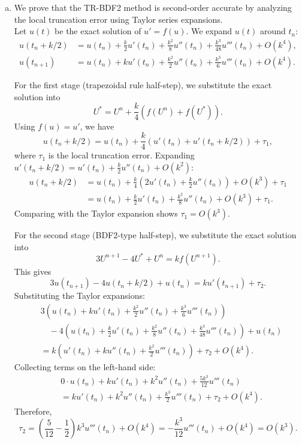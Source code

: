 \documentclass{article}
\begin{document}
\begin{enumerate}[(a)]
  \item We prove that the TR-BDF2 method is second-order accurate by analyzing the local truncation error using Taylor series expansions. \\
    
    Let $u(t)$ be the exact solution of $u' = f(u)$. We expand $u(t)$ around $t_n$:
    \begin{align*}
    u(t_n + k/2) &= u(t_n) + \frac{k}{2}u'(t_n) + \frac{k^2}{8}u''(t_n) + \frac{k^3}{48}u'''(t_n) + O(k^4), \\
    u(t_{n+1}) &= u(t_n) + ku'(t_n) + \frac{k^2}{2}u''(t_n) + \frac{k^3}{6}u'''(t_n) + O(k^4).
    \end{align*}
    
    For the first stage (trapezoidal rule half-step), we substitute the exact solution into
    \begin{equation}
      U^{*} = U^n + \frac{k}{4}(f(U^n) + f(U^{*})). \label{eq:Q2Step1}
    \end{equation}
    Using $f(u) = u'$, we have
    \[
    u(t_n + k/2) = u(t_n) + \frac{k}{4}(u'(t_n) + u'(t_n + k/2)) + \tau_1,
    \]
    where $\tau_1$ is the local truncation error. Expanding $u'(t_n + k/2) = u'(t_n) + \frac{k}{2}u''(t_n) + O(k^2)$:
    \begin{align*}
    u(t_n + k/2) &= u(t_n) + \frac{k}{4}\left(2u'(t_n) + \frac{k}{2}u''(t_n)\right) + O(k^3) + \tau_1 \\
                 &= u(t_n) + \frac{k}{2}u'(t_n) + \frac{k^2}{8}u''(t_n) + O(k^3) + \tau_1.
    \end{align*}
    Comparing with the Taylor expansion shows $\tau_1 = O(k^3)$.
    
    For the second stage (BDF2-type half-step), we substitute the exact solution into
    \begin{equation}
      3U^{n+1} - 4U^{*} + U^n = k f(U^{n+1}). \label{eq:Q2Step2}
    \end{equation}
    This gives
    \[
    3u(t_{n+1}) - 4u(t_n + k/2) + u(t_n) = ku'(t_{n+1}) + \tau_2.
    \]
    Substituting the Taylor expansions:
    \begin{align*}
    &3\left(u(t_n) + ku'(t_n) + \frac{k^2}{2}u''(t_n) + \frac{k^3}{6}u'''(t_n)\right) \\
    &\quad - 4\left(u(t_n) + \frac{k}{2}u'(t_n) + \frac{k^2}{8}u''(t_n) + \frac{k^3}{48}u'''(t_n)\right) + u(t_n) \\
    &= k\left(u'(t_n) + ku''(t_n) + \frac{k^2}{2}u'''(t_n)\right) + \tau_2 + O(k^4).
    \end{align*}
    Collecting terms on the left-hand side:
    \begin{align*}
    &0 \cdot u(t_n) + ku'(t_n) + k^2u''(t_n) + \frac{5k^3}{12}u'''(t_n) \\
    &= ku'(t_n) + k^2u''(t_n) + \frac{k^3}{2}u'''(t_n) + \tau_2 + O(k^4).
    \end{align*}
    Therefore,
    \[
    \tau_2 = \left(\frac{5}{12} - \frac{1}{2}\right)k^3u'''(t_n) + O(k^4) = -\frac{k^3}{12}u'''(t_n) + O(k^4) = O(k^3).
    \]
    

\end{enumerate}
\end{document}
